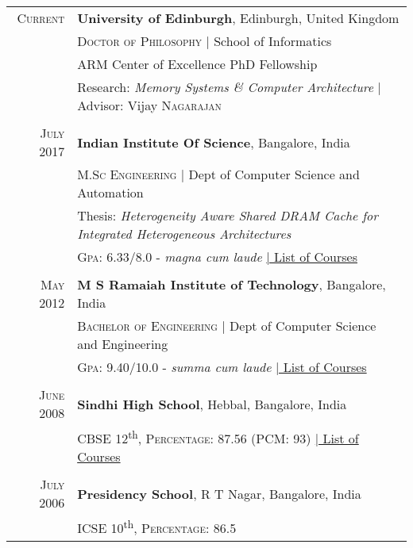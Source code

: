 \documentclass[a4paper,10pt]{article} %
\begin{document}
\begin{tabular}{rl}

\textsc{Current}  & \textbf{University of Edinburgh}, Edinburgh, United Kingdom\\
& \textsc{Doctor of Philosophy} | School of Informatics\\
& ARM Center of Excellence PhD Fellowship\\
& Research: \small\emph{Memory Systems \& Computer Architecture} | Advisor: Vijay \textsc{Nagarajan}\\
&\\



\textsc{July} 2017 & \textbf{Indian Institute Of Science}, Bangalore, India\\
& \textsc{M.Sc Engineering} | Dept of Computer Science and Automation\\
& Thesis: \small\emph{Heterogeneity Aware Shared DRAM Cache for Integrated Heterogeneous Architectures} \\
&\normalsize \textsc{Gpa}: 6.33/8.0 - \small\emph{magna cum laude} \hyperlink{iisc}{\hfill | \footnotesize List of Courses}\\
&\\


\textsc{May} 2012 & \textbf{M S Ramaiah Institute of Technology}, Bangalore, India\\
& \textsc{Bachelor of Engineering} | Dept of Computer Science and Engineering \\
&\normalsize \textsc{Gpa}: 9.40/10.0 - \small\emph{summa cum laude} \hyperlink{msrit}{\hfill| \footnotesize List of Courses}\\
&\\


\textsc{June} 2008 & \textbf{Sindhi High School}, Hebbal, Bangalore, India\\
& \textsc{CBSE 12}\textsuperscript{th}, \normalsize \textsc{Percentage}: 87.56 (PCM: 93) \hyperlink{hs}{\hfill| \footnotesize List of Courses}\\
&\\


\textsc{July} 2006 & \textbf{Presidency School}, R T Nagar, Bangalore, India\\
& \textsc{ICSE 10}\textsuperscript{th}, \normalsize \textsc{Percentage}: 86.5 \\
\end{tabular}
\end{document}
